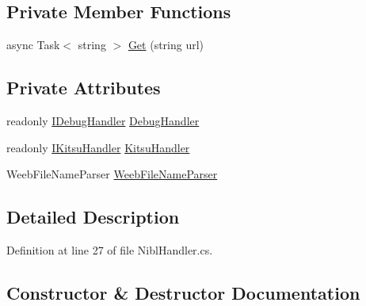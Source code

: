 \subsection*{Private Member Functions}
\begin{DoxyCompactItemize}
\item 
async Task$<$ string $>$ \mbox{\hyperlink{class_little_weeb_library_1_1_handlers_1_1_nibl_handler_a2989b180582fadd05111d010c0700411}{Get}} (string url)
\end{DoxyCompactItemize}
\subsection*{Private Attributes}
\begin{DoxyCompactItemize}
\item 
readonly \mbox{\hyperlink{interface_little_weeb_library_1_1_handlers_1_1_i_debug_handler}{I\+Debug\+Handler}} \mbox{\hyperlink{class_little_weeb_library_1_1_handlers_1_1_nibl_handler_a334c2111588fa71d1203bd8cbb572970}{Debug\+Handler}}
\item 
readonly \mbox{\hyperlink{interface_little_weeb_library_1_1_handlers_1_1_i_kitsu_handler}{I\+Kitsu\+Handler}} \mbox{\hyperlink{class_little_weeb_library_1_1_handlers_1_1_nibl_handler_ac0392c6b723e01d26c8a45d64575c5af}{Kitsu\+Handler}}
\item 
Weeb\+File\+Name\+Parser \mbox{\hyperlink{class_little_weeb_library_1_1_handlers_1_1_nibl_handler_a0aae159f51f737bbb89946b8fe8c8743}{Weeb\+File\+Name\+Parser}}
\end{DoxyCompactItemize}


\subsection{Detailed Description}


Definition at line 27 of file Nibl\+Handler.\+cs.



\subsection{Constructor \& Destructor Documentation}
\mbox{\label{class_little_weeb_library_1_1_handlers_1_1_nibl_handler_afdd2ee189bd6bec0a1fb4a309498e6c2}} 
